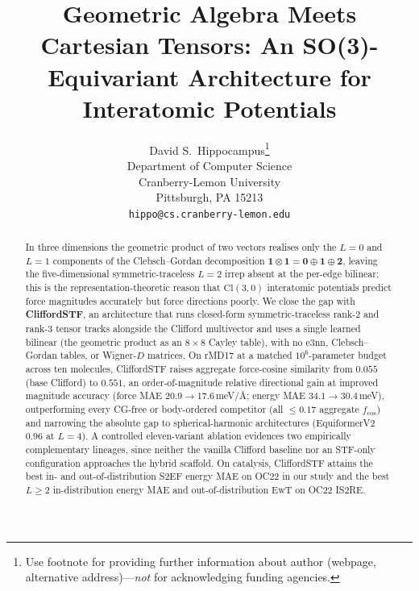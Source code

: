 \documentclass{article}
\title{Geometric Algebra Meets Cartesian Tensors: An SO(3)-Equivariant Architecture for \\Interatomic Potentials}
\author{%
  David S.~Hippocampus\thanks{Use footnote for providing further information
    about author (webpage, alternative address)---\emph{not} for acknowledging
    funding agencies.} \\
  Department of Computer Science\\
  Cranberry-Lemon University\\
  Pittsburgh, PA 15213 \\
  \texttt{hippo@cs.cranberry-lemon.edu} \\
}
\begin{document}
\maketitle

\begin{abstract}
In three dimensions the geometric product of two vectors realises only the $L{=}0$ and $L{=}1$ components of the Clebsch--Gordan decomposition $\mathbf{1}\otimes\mathbf{1}=\mathbf{0}\oplus\mathbf{1}\oplus\mathbf{2}$, leaving the five-dimensional symmetric-traceless $L{=}2$ irrep absent at the per-edge bilinear; this is the representation-theoretic reason that $\mathrm{Cl}(3,0)$ interatomic potentials predict force magnitudes accurately but force directions poorly. We close the gap with \textbf{CliffordSTF}, an architecture that runs closed-form symmetric-traceless rank-2 and rank-3 tensor tracks alongside the Clifford multivector and uses a single learned bilinear (the geometric product as an $8\times 8$ Cayley table), with no e3nn, Clebsch--Gordan tables, or Wigner-$D$ matrices. On rMD17 at a matched $10^6$-parameter budget across ten molecules, CliffordSTF raises aggregate force-cosine similarity from $0.055$ (base Clifford) to $0.551$, an order-of-magnitude relative directional gain at improved magnitude accuracy (force MAE $20.9\to17.6$\,meV/\AA{}; energy MAE $34.1\to30.4$\,meV), outperforming every CG-free or body-ordered competitor (all $\leq 0.17$ aggregate $f_\mathrm{cos}$) and narrowing the absolute gap to spherical-harmonic architectures (EquiformerV2 $0.96$ at $L{=}4$). A controlled eleven-variant ablation evidences two empirically complementary lineages, since neither the vanilla Clifford baseline nor an STF-only configuration approaches the hybrid scaffold. On catalysis, CliffordSTF attains the best in- and out-of-distribution S2EF energy MAE on OC22 in our study and the best $L\!\geq\!2$ in-distribution energy MAE and out-of-distribution EwT on OC22 IS2RE.
\end{abstract}
 










\newpage
\appendix



\newpage

\end{document}
